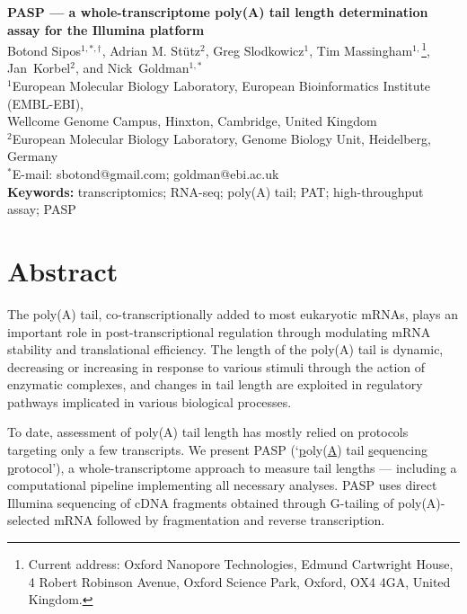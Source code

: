 \documentclass[10pt]{article}
\date{}
\begin{document}
\begin{flushleft}
{\Large
\textbf{PASP --- a whole-transcriptome poly(A) tail length determination assay for the Illumina platform}
}
\\
\vspace{5mm}
Botond Sipos$^{1, \ast, \dagger}$, 
Adrian M. St\"utz$^{2}$, 
Greg Slodkowicz$^{1}$,
Tim Massingham$^{1,}$\footnote{Current address: Oxford Nanopore Technologies, Edmund Cartwright House, 4 Robert Robinson Avenue, Oxford Science Park, Oxford, OX4 4GA, United Kingdom.},
Jan~Korbel$^{2}$, and 
Nick~Goldman$^{1, \ast}$
\\
\vspace{5mm}
$^1$European Molecular Biology Laboratory, European Bioinformatics Institute (EMBL-EBI), \\
Wellcome Genome Campus, Hinxton, Cambridge, United Kingdom
\\
$^2$European Molecular Biology Laboratory, Genome Biology Unit, Heidelberg, Germany 
\\
$^\ast$E-mail: sbotond@gmail.com; goldman@ebi.ac.uk
\\
\vspace{5mm}
\textbf{Keywords:} transcriptomics; RNA-seq; poly(A) tail; PAT; high-throughput assay; PASP

\end{flushleft}

\section*{Abstract}

The poly(A) tail, co-transcriptionally added to most eukaryotic mRNAs, plays an important role in post-transcriptional regulation through modulating mRNA stability and translational efficiency. The length of the poly(A) tail is dynamic, decreasing or increasing in response to various stimuli through the action of enzymatic complexes, and changes in tail length are exploited in regulatory pathways implicated in various biological processes.

To date, assessment of poly(A) tail length has mostly relied on protocols targeting only a few transcripts. We present PASP 
(`{\underline{p}}oly({\underline{A}}) tail {\underline{s}}equencing {\underline{p}}rotocol'), 
a whole-transcriptome approach to measure tail lengths  --- including a computational pipeline implementing all necessary analyses. PASP uses direct Illumina sequencing of cDNA fragments obtained through G-tailing of poly(A)-selected mRNA followed by fragmentation and reverse transcription. 
\end{document}
